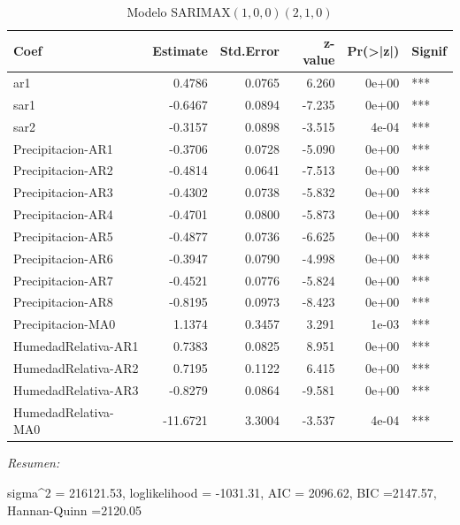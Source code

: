 \documentclass[12pt,oneside]{book}\usepackage[]{graphicx}\usepackage[]{color}
\newenvironment{knitrout}{}{} %
\theoremstyle{definition} %
\begin{document}
\begin{knitrout}
\begin{table}
\caption{\label{tab:unnamed-chunk-52}\label{tab:sarimax_estim2}Modelo SARIMAX$(1,0,0)(2,1,0)$}
\centering
\begin{threeparttable}
\begin{tabular}[t]{lrrrrl}
\toprule
Coef & Estimate & Std.Error & z-value & Pr(>|z|) & Signif\\
\midrule
\rowcolor{gray!6}  ar1 & 0.4786 & 0.0765 & 6.260 & 0e+00 & ***\\
sar1 & -0.6467 & 0.0894 & -7.235 & 0e+00 & ***\\
\rowcolor{gray!6}  sar2 & -0.3157 & 0.0898 & -3.515 & 4e-04 & ***\\
Precipitacion-AR1 & -0.3706 & 0.0728 & -5.090 & 0e+00 & ***\\
\rowcolor{gray!6}  Precipitacion-AR2 & -0.4814 & 0.0641 & -7.513 & 0e+00 & ***\\
\addlinespace
Precipitacion-AR3 & -0.4302 & 0.0738 & -5.832 & 0e+00 & ***\\
\rowcolor{gray!6}  Precipitacion-AR4 & -0.4701 & 0.0800 & -5.873 & 0e+00 & ***\\
Precipitacion-AR5 & -0.4877 & 0.0736 & -6.625 & 0e+00 & ***\\
\rowcolor{gray!6}  Precipitacion-AR6 & -0.3947 & 0.0790 & -4.998 & 0e+00 & ***\\
Precipitacion-AR7 & -0.4521 & 0.0776 & -5.824 & 0e+00 & ***\\
\addlinespace
\rowcolor{gray!6}  Precipitacion-AR8 & -0.8195 & 0.0973 & -8.423 & 0e+00 & ***\\
Precipitacion-MA0 & 1.1374 & 0.3457 & 3.291 & 1e-03 & ***\\
\rowcolor{gray!6}  HumedadRelativa-AR1 & 0.7383 & 0.0825 & 8.951 & 0e+00 & ***\\
HumedadRelativa-AR2 & 0.7195 & 0.1122 & 6.415 & 0e+00 & ***\\
\rowcolor{gray!6}  HumedadRelativa-AR3 & -0.8279 & 0.0864 & -9.581 & 0e+00 & ***\\
\addlinespace
HumedadRelativa-MA0 & -11.6721 & 3.3004 & -3.537 & 4e-04 & ***\\
\bottomrule
\end{tabular}
\begin{tablenotes}
\item \textit{Resumen:} 
\item sigma\textasciicircum{}2 = 216121.53, loglikelihood = -1031.31, AIC = 2096.62, BIC =2147.57, Hannan-Quinn =2120.05
\end{tablenotes}
\end{threeparttable}
\end{table}


\end{knitrout}
\end{document}
